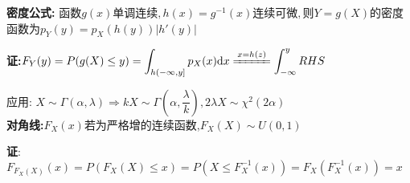 \textbf{密度公式:}
函数$g(x)单调连续,h(x) = g^{-1}(x)连续可微,则Y = g(X)$的密度函数为$ p_Y(y) = p_X(h(y))|h'(y)|$

\textbf{证:}$F_Y(y) = P(g(X)\le y)=\int_{h(-\infty,y]}{p_X(x)\mathrm{d}x}
\xlongequal{x=h(z)}\int_{-\infty}^{y}RHS$

应用: $X\sim \Gamma(\alpha, \lambda) \Rightarrow  kX \sim \Gamma(\alpha, \dfrac{\lambda}{k}), 2\lambda X \sim \chi^2(2\alpha)$
\\

\textbf{对角线:}$ F_X(x)$若为严格增的连续函数,$F_X(X) \sim U(0,1)$

\textbf{证}:$ F_{F_X(X)}(x) = P(F_X(X)\le x) = P(X \le F_X^{-1}(x)) = F_X(F_X^{-1}(x)) =x$

